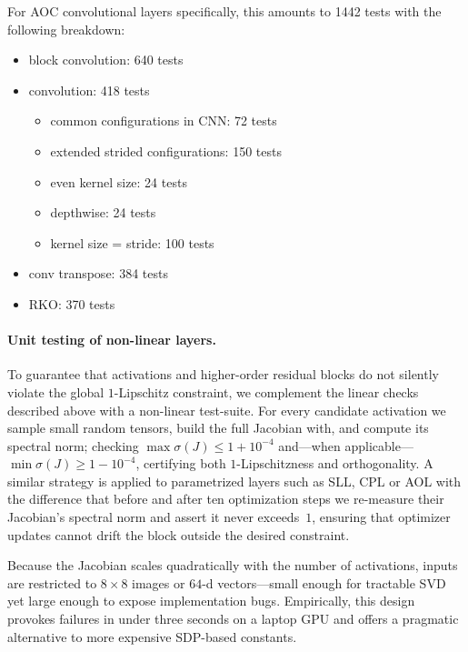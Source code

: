     For AOC convolutional layers specifically, this amounts to 1442 tests with the following breakdown:
    \begin{itemize}
        \item block convolution: 640 tests
        \item convolution: 418 tests
        \begin{itemize}
            \item common configurations in CNN: 72 tests
            \item extended strided configurations: 150 tests
            \item even kernel size: 24 tests
            \item depthwise: 24 tests
            \item kernel size = stride: 100 tests
        \end{itemize}
        \item conv transpose: 384 tests
        \item RKO: 370 tests
    \end{itemize}

    \paragraph{Unit testing of non-linear layers.}
    To guarantee that activations and higher-order residual blocks do not silently violate the global $1$-Lipschitz constraint, we complement the linear checks described above with a non-linear test-suite.  
    For every candidate activation we sample small random tensors, build the full Jacobian with, and compute its spectral norm; checking $\max\sigma(J)\le1+10^{-4}$ and—when applicable— $\min\sigma(J)\ge1-10^{-4}$, certifying both $1$-Lipschitzness and orthogonality.  
    A similar strategy is applied to parametrized layers such as SLL, CPL or AOL \cite{araujo_unified_2023, xiao_dynamical_2018, prach_almost-orthogonal_2022} with the difference that before and after ten optimization steps we re-measure their Jacobian's spectral norm and assert it never exceeds~$1$, ensuring that optimizer updates cannot drift the block outside the desired constraint.  
    
    Because the Jacobian scales quadratically with the number of activations, inputs are restricted to $8 \times 8$ images or $64$-d vectors—small enough for tractable SVD yet large enough to expose implementation bugs. Empirically, this design provokes failures in under three seconds on a laptop GPU and offers a pragmatic alternative to more expensive SDP-based constants.

